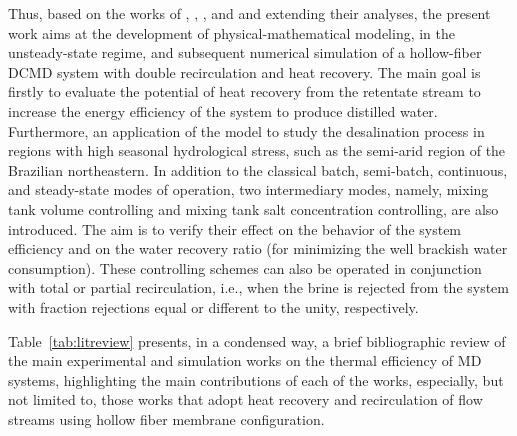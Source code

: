 \documentclass[14pt,letterpaper,fleqn]{extarticle}
\begin{document}
Thus, based on the works of \citet{Swaminathan2018}, \citet{Christie2020},
\citet{Lisboa2021}, and \citet{Sampaio2022} and extending their analyses, the present
work aims at the development of physical-mathematical modeling, in the unsteady-state
regime, and subsequent numerical simulation of a hollow-fiber DCMD system with double
recirculation and heat recovery. The main goal is firstly to evaluate the potential of
heat recovery from the retentate stream to increase the energy efficiency of the system
to produce distilled water. Furthermore, an application of the model to study the
desalination process in regions with high seasonal hydrological stress, such as the
semi-arid region of the Brazilian northeastern. In addition to the classical batch,
semi-batch, continuous, and steady-state modes of operation, two intermediary modes,
namely, mixing tank volume controlling and mixing tank salt concentration controlling,
are also introduced. The aim is to verify their effect on the behavior of the system
efficiency and on the water recovery ratio (for minimizing the well brackish water
consumption). These controlling schemes can also be operated in conjunction with total or
partial recirculation, i.e., when the brine is rejected from the system with fraction
rejections equal or different to the unity, respectively.

Table~\ref{tab:litreview} presents, in a condensed way, a brief bibliographic review
of the main experimental and simulation works on the thermal efficiency of MD systems,
highlighting the main contributions of each of the works, especially, but not limited to,
those works that adopt heat recovery and recirculation of flow streams using hollow fiber
membrane configuration.
\end{document}
